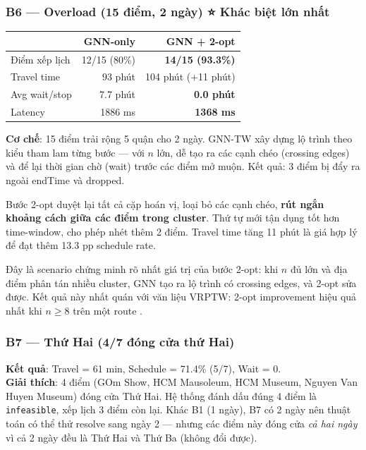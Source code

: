 \documentclass[12pt,a4paper]{article}
\begin{document}
\subsubsection*{B6 --- Overload (15 điểm, 2 ngày) ⭐ Khác biệt lớn nhất}

\begin{tcolorbox}[resultbox, title={B6 --- GNN + 2-opt cải thiện 13.3 pp schedule rate}]
\begin{tabular}{lrr}
\toprule
& \textbf{GNN-only} & \textbf{GNN + 2-opt} \\
\midrule
Điểm xếp lịch   & 12/15 (80\%)  & \textbf{14/15 (93.3\%)} \\
Travel time      & 93 phút       & 104 phút (+11 phút) \\
Avg wait/stop    & 7.7 phút      & \textbf{0.0 phút} \\
Latency          & 1886 ms       & \textbf{1368 ms} \\
\bottomrule
\end{tabular}
\end{tcolorbox}

\textbf{Cơ chế}: 15 điểm trải rộng 5 quận cho 2 ngày. GNN-TW xây dựng lộ trình theo kiểu
tham lam từng bước --- với $n$ lớn, dễ tạo ra các cạnh chéo (crossing edges) và để lại
thời gian chờ (wait) trước các điểm mở muộn. Kết quả: 3 điểm bị đẩy ra ngoài endTime và dropped.

Bước 2-opt duyệt lại tất cả cặp hoán vị, loại bỏ các cạnh chéo, \textbf{rút ngắn khoảng cách giữa
các điểm trong cluster}. Thứ tự mới tận dụng tốt hơn time-window, cho phép nhét thêm 2 điểm.
Travel time tăng 11 phút là giá hợp lý để đạt thêm 13.3 pp schedule rate.

\begin{tcolorbox}[warnbox, title={Nhận định cho báo cáo}]
Đây là scenario chứng minh rõ nhất giá trị của bước 2-opt: khi $n$ đủ lớn và địa điểm phân tán
nhiều cluster, GNN tạo ra lộ trình có crossing edges, và 2-opt sửa được.
Kết quả này nhất quán với văn liệu VRPTW: 2-opt improvement hiệu quả nhất khi
$n \geq 8$ trên một route \cite{braysy2005}.
\end{tcolorbox}

\subsubsection*{B7 --- Thứ Hai (4/7 đóng cửa thứ Hai)}
\begin{tcolorbox}[warnbox, title={B7 --- Kiểm tra đóng cửa đa ngày}]
\textbf{Kết quả}: Travel = 61 min, Schedule = 71.4\% (5/7), Wait = 0.\\
\textbf{Giải thích}: 4 điểm (GOm Show, HCM Mausoleum, HCM Museum, Nguyen Van Huyen Museum)
đóng cửa Thứ Hai. Hệ thống đánh dấu đúng 4 điểm là \texttt{infeasible}, xếp lịch 3 điểm còn lại.
Khác B1 (1 ngày), B7 có 2 ngày nên thuật toán có thể thử resolve sang ngày 2 --- nhưng các điểm này
đóng cửa \textit{cả hai ngày} vì cả 2 ngày đều là Thứ Hai và Thứ Ba (không đổi được).
\end{tcolorbox}
\end{document}
